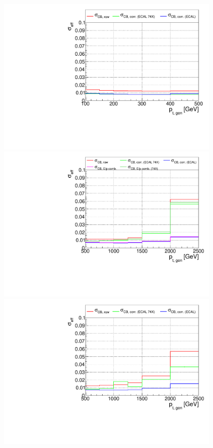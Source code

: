 \begin{figure}[hbtp]
\begin{center}
    \includegraphics[width=\halflinewidth]{img/regression/pt500_effsigma_photons.pdf}
    \\
    \includegraphics[width=\halflinewidth]{img/regression/pt2500_effsigma_electrons.pdf}
    \includegraphics[width=\halflinewidth]{img/regression/pt2500_effsigma_photons.pdf}

\end{center}
\end{figure}
